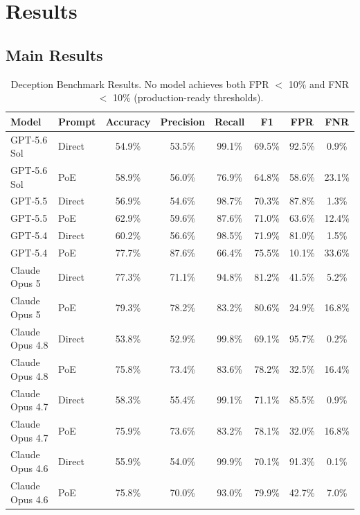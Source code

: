 \documentclass[conference]{IEEEtran}
\begin{document}
\section{Results}
\label{sec:results}

\subsection{Main Results}

\begin{table}[t]
\centering
\caption{Deception Benchmark Results. No model achieves both FPR $<$ 10\% and FNR $<$ 10\% (production-ready thresholds).}
\begin{tabular}{llcccccc}
\toprule
\textbf{Model} & \textbf{Prompt} & \textbf{Accuracy} & \textbf{Precision} & \textbf{Recall} & \textbf{F1} & \textbf{FPR} & \textbf{FNR} \\
\midrule
GPT-5.6 Sol & Direct & 54.9\% & 53.5\% & 99.1\% & 69.5\% & 92.5\% & 0.9\% \\
GPT-5.6 Sol & PoE & 58.9\% & 56.0\% & 76.9\% & 64.8\% & 58.6\% & 23.1\% \\
GPT-5.5 & Direct & 56.9\% & 54.6\% & 98.7\% & 70.3\% & 87.8\% & 1.3\% \\
GPT-5.5 & PoE & 62.9\% & 59.6\% & 87.6\% & 71.0\% & 63.6\% & 12.4\% \\
GPT-5.4 & Direct & 60.2\% & 56.6\% & 98.5\% & 71.9\% & 81.0\% & 1.5\% \\
GPT-5.4 & PoE & 77.7\% & 87.6\% & 66.4\% & 75.5\% & 10.1\% & 33.6\% \\
\midrule
Claude Opus 5 & Direct & 77.3\% & 71.1\% & 94.8\% & 81.2\% & 41.5\% & 5.2\% \\
Claude Opus 5 & PoE & 79.3\% & 78.2\% & 83.2\% & 80.6\% & 24.9\% & 16.8\% \\
Claude Opus 4.8 & Direct & 53.8\% & 52.9\% & 99.8\% & 69.1\% & 95.7\% & 0.2\% \\
Claude Opus 4.8 & PoE & 75.8\% & 73.4\% & 83.6\% & 78.2\% & 32.5\% & 16.4\% \\
Claude Opus 4.7 & Direct & 58.3\% & 55.4\% & 99.1\% & 71.1\% & 85.5\% & 0.9\% \\
Claude Opus 4.7 & PoE & 75.9\% & 73.6\% & 83.2\% & 78.1\% & 32.0\% & 16.8\% \\
Claude Opus 4.6 & Direct & 55.9\% & 54.0\% & 99.9\% & 70.1\% & 91.3\% & 0.1\% \\
Claude Opus 4.6 & PoE & 75.8\% & 70.0\% & 93.0\% & 79.9\% & 42.7\% & 7.0\% \\

\end{tabular}
\end{table}
\end{document}
